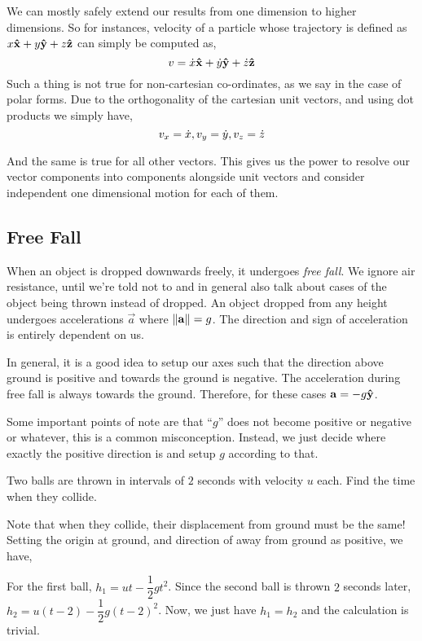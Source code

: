 We can mostly safely extend our results from one dimension to higher dimensions.
So for instances, velocity of a particle whose trajectory is defined as 
\(x\boldsymbol{\mathbf{\hat{x}}} + y\boldsymbol{\mathbf{\hat{y}}} + z\boldsymbol{\mathbf{\hat{z}}}\) can simply be computed as,
\[v = \dot{x}\boldsymbol{\mathbf{\hat{x}}} + \dot{y}\boldsymbol{\mathbf{\hat{y}}} + \dot{z}\boldsymbol{\mathbf{\hat{z}}}\] Such a thing
is not true for non-cartesian co-ordinates, as we say in the case of polar forms.
Due to the orthogonality of the cartesian unit vectors, and using dot products
we simply have, 
\[v_x = \dot{x}, v_y = \dot{y}, v_z = \dot{z}\]

And the same is true for all other vectors. This gives us the power to
resolve our vector components into components alongside unit vectors
and consider independent one dimensional motion for each of them.

\subsection{Free Fall}

When an object is dropped downwards freely, it undergoes \emph{free fall}. We ignore
air resistance, until we're told not to and in general also talk about cases of the
object being thrown instead of dropped. An object dropped from any height undergoes
accelerations \(\vec{a}\) where \(\norm{\boldsymbol{\mathbf{a}}} = g\). The direction and sign of acceleration
is entirely dependent on us.

In general, it is a good idea to setup our axes such that the direction above ground is positive
and towards the ground is negative. The acceleration during free fall is always towards
the ground. Therefore, for these cases \(\boldsymbol{\mathbf{a}} = -g \boldsymbol{\mathbf{\hat{y}}}\). 

Some important points of note are that ``\(g\)'' does not become positive or negative or whatever,
this is a common misconception. Instead, we just decide where exactly the positive direction is
and setup \(g\) according to that.

\begin{example}
    Two balls are thrown in intervals of \(2\) seconds with velocity \(u\) each. Find the
    time when they collide.
    \begin{soln}
        Note that when they collide, their displacement from ground must be the same! Setting 
        the origin at ground, and direction of away from ground as positive, we have,
        
        For the first ball, \(h_{1} = ut - \dfrac{1}{2}gt^2\). Since the second ball
        is thrown \(2\) seconds later, \(h_{2} = u(t-2) - \dfrac{1}{2}g(t-2)^2\). Now, we just have
        \(h_{1} = h_{2}\) and the calculation is trivial.
    \end{soln}
\end{example}

